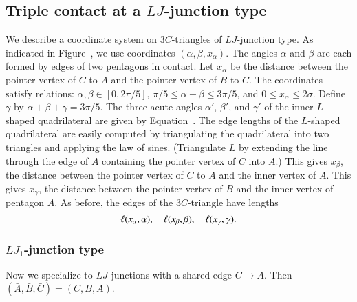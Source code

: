 \subsection{Triple contact at a $LJ$-junction type}

We describe a coordinate system on $3C$-triangles of $LJ$-junction
type.  As indicated in Figure~, we use coordinates
$(\alpha,\beta,x_\alpha)$.  The angles $\alpha$ and $\beta$ are each
formed by edges of two pentagons in contact.  Let $x_\alpha$ be the
distance between the pointer vertex of $C$ to $A$ and the pointer
vertex of $B$ to $C$.  The coordinates satisfy relations:
$\alpha,\beta\in [0,2\pi/5]$, $\pi/5\le\alpha+\beta\le 3\pi/5$, and
$0\le x_\alpha\le 2\sigma$.  Define $\gamma$ by
$\alpha+\beta+\gamma=3\pi/5$.  The three acute angles $\alpha'$,
$\beta'$, and $\gamma'$ of the inner $L$-shaped quadrilateral are
given by Equation~.  The edge lengths of the $L$-shaped
quadrilateral are easily computed by triangulating the quadrilateral
into two triangles and applying the law of sines.  (Triangulate $L$ by
extending the line through the edge of $A$ containing the pointer
vertex of $C$ into $A$.)  This gives $x_\beta$, the distance between
the pointer vertex of $C$ to $A$ and the inner vertex of $A$.  This
gives $x_\gamma$, the distance between the pointer vertex of $B$ and
the inner vertex of pentagon $A$.  As before, the edges of the
$3C$-triangle have lengths
\[
\ell(x_\alpha,\alpha),\quad \ell(x_\beta,\beta),\quad \ell(x_\gamma,\gamma).
\]


\subsubsection{$LJ_1$-junction type}

Now we specialize to $LJ$-junctions with a shared edge $C\to A$.
Then $(\bar A,\bar B,\bar C)=(C,B,A)$.

